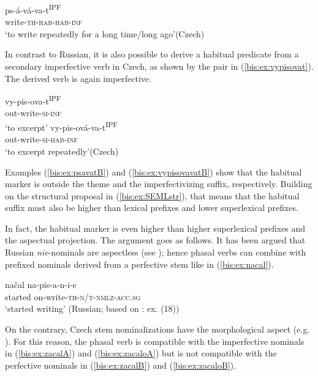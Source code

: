 \documentclass[output=paper]{langscibook}
\begin{document}
\ea\label{bis:ex:psavavat}
\gll 
ps-á-vá-va-t\textsuperscript{IPF} \\ 
write-\textsc{th}-\textsc{hab}-\textsc{hab}-\textsc{inf} \\
\glt ‘to write repeatedly for a long time/long ago’\hfill (Czech)
\z

\noindent In contrast to Russian, it is also possible to derive a habitual predicate from a secondary imperfective verb in Czech, as shown by the pair in (\ref{bis:ex:vypisovat}). The derived verb is again imperfective. 

\ea\label{bis:ex:vypisovat}
\ea\label{bis:ex:vypisovatA} \gll 
vy-pis-ova-t\textsuperscript{IPF} \\ 
out-write-\textsc{si}-\textsc{inf} \\
\glt ‘to excerpt’
\ex\label{bis:ex:vypisovavatB} \gll vy-pis-ová-va-t\textsuperscript{IPF} \\
out-write-\textsc{si}-\textsc{hab}-\textsc{inf} \\
\glt ‘to excerpt repeatedly’\hfill (Czech)
\z
\z

\noindent Examples (\ref{bis:ex:psavatB}) and (\ref{bis:ex:vypisovavatB}) show that the habitual marker is outside the theme and the imperfectivizing suffix, respectively. Building on the structural proposal in (\ref{bis:ex:SEMLstr}), that means that the habitual suffix must also be higher than lexical prefixes and lower superlexical prefixes.

In fact, the habitual marker is even higher than higher superlexical prefixes and the aspectual projection. The argument goes as follows. It has been argued that Russian \textit{nie}-nominals are aspectless (see \citealt{Svedova1980,Schoorlemmer1995,Gehrke2008b,Tatevosov2011,Tatevosov2020}); hence phasal verbs can combine with prefixed nominals derived from a perfective stem like in (\ref{bis:ex:nacal}). 

\ea\label{bis:ex:nacal}
\gll 
načal 		na-pis-a-n-i-e \\ 
started	on-write-\textsc{th}-\textsc{n/t}-\textsc{nmlz}-\textsc{acc.sg} \\
\glt ‘started writing’  \hfill (Russian; based on \citealt{Tatevosov2011}: ex. (18))
\z

\noindent On the contrary, Czech stem nominalizations have the morphological aspect (e.g. \citealt{Prochazkova2006}). For this reason, the phasal verb is compatible with the imperfective nominals in (\ref{bis:ex:zacalA}) and (\ref{bis:ex:zacaloA}) but is not compatible with the perfective nominals in (\ref{bis:ex:zacalB}) and (\ref{bis:ex:zacaloB}).\largerpage
\end{document}
